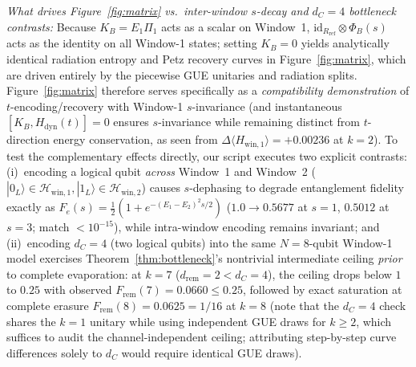 \documentclass[11pt,a4paper]{article}
\theoremstyle{definition}
\theoremstyle{remark}
\newcommand{\id}{\mathrm{id}}
\newcommand{\cH}{\mathcal{H}}
\newcommand{\1}{\mathbf{1}}
\begin{document}
\begin{enumerate}
  \emph{What drives Figure~\ref{fig:matrix} vs.\ inter-window $s$-decay and $d_C=4$ bottleneck contrasts:} Because $K_B = E_1\Pi_1$ acts as a scalar on Window~1, $\id_{R_{\mathrm{ref}}}\otimes\Phi_B(s)$ acts as the identity on all Window-1 states; setting $K_B=0$ yields analytically identical radiation entropy and Petz recovery curves in Figure~\ref{fig:matrix}, which are driven entirely by the piecewise GUE unitaries and radiation splits. Figure~\ref{fig:matrix} therefore serves specifically as a \emph{compatibility demonstration} of $t$-encoding/recovery with Window-1 $s$-invariance (and instantaneous $[K_B,H_{\mathrm{dyn}}(t)]=0$ ensures $s$-invariance while remaining distinct from $t$-direction energy conservation, as seen from $\Delta\langle H_{\mathrm{win},1}\rangle = +0.00236$ at $k=2$). To test the complementary effects directly, our script executes two explicit contrasts: (i)~encoding a logical qubit \emph{across} Window~1 and Window~2 ($|0_L\rangle\in\cH_{\mathrm{win},1}, |1_L\rangle\in\cH_{\mathrm{win},2}$) causes $s$-dephasing to degrade entanglement fidelity exactly as $F_e(s) = \frac{1}{2}(1+e^{-(E_1-E_2)^2 s/2})$ ($1.0 \to 0.5677$ at $s=1$, $0.5012$ at $s=3$; match $<10^{-15}$), while intra-window encoding remains invariant; and (ii)~encoding $d_C=4$ (two logical qubits) into the same $N=8$-qubit Window-1 model exercises Theorem~\ref{thm:bottleneck}'s nontrivial intermediate ceiling \emph{prior} to complete evaporation: at $k=7$ ($d_{\mathrm{rem}}=2 < d_C=4$), the ceiling drops below $1$ to $0.25$ with observed $F_{\mathrm{rem}}(7) = 0.0660 \le 0.25$, followed by exact saturation at complete erasure $F_{\mathrm{rem}}(8) = 0.0625 = 1/16$ at $k=8$ (note that the $d_C=4$ check shares the $k=1$ unitary while using independent GUE draws for $k\ge 2$, which suffices to audit the channel-independent ceiling; attributing step-by-step curve differences solely to $d_C$ would require identical GUE draws).


\end{enumerate}
\end{document}
